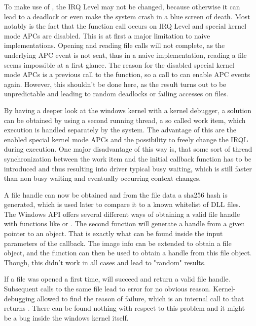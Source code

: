 To make use of , the IRQ Level may not be changed, because otherwise it can lead to a deadlock or even make the system crash in a blue screen of death. Most notably is the fact that the function call occurs on IRQ Level  and special kernel mode APCs are disabled. This is at first a major limitation to naive implementations. Opening and reading file calls will not complete, as the underlying APC event is not sent, thus in a naive implementation, reading a file seems impossible at a first glance. The reason for the disabled special kernel mode APCs is a previous call to the  function, so a call to  can enable APC events again. However, this shouldn't be done here, as the result turns out to be unpredictable and leading to random deadlocks or failing accesses on files.

By having a deeper look at the windows kernel with a kernel debugger, a solution can be obtained by using a second running thread, a so called work item, which execution is handled separately by the system. The advantage of this are the enabled special kernel mode APCs and the possibility to freely change the IRQL during execution. One major disadvantage of this way is, that some sort of thread synchronization between the work item and the initial callback function has to be introduced and thus resulting into driver typical busy waiting, which is still faster than non busy waiting and eventually occurring context changes. 

A file handle can now be obtained and from the file data a sha256 hash is generated, which is used later to compare it to a known whitelist of DLL files. The Windows API offers several different ways of obtaining a valid file handle with functions like  or . The second function  will generate a handle from a given pointer to an object. That is exactly what can be found inside the input parameters of the  callback. The image info can be extended to obtain a file object, and the  function can then be used to obtain a handle from this file object. Though, this didn't work in all cases and lead to "random" results. 

If a file was opened a first time,  will succeed and return a valid file handle. Subsequent calls to the same file lead to error  for no obvious reason. Kernel-debugging allowed to find the reason of failure, which is an internal call to  that returns . There can be found nothing with respect to this problem and it might be a bug inside the windows kernel itself. 

